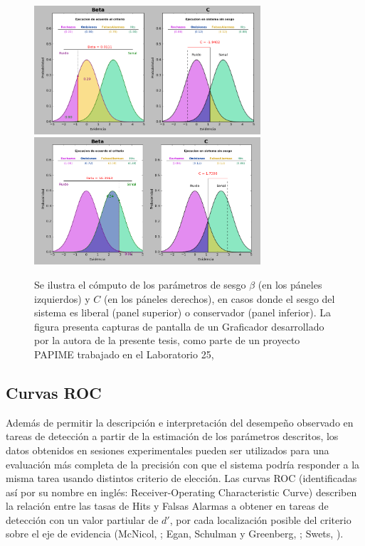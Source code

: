 \begin{itemize}
\begin{figure}[th]
\centering
\includegraphics[width=0.75\textwidth]{Figures/Graficador_Sesgo_Liberal}\\
\includegraphics[width=0.75\textwidth]{Figures/Graficador_Sesgo_Conservador}\\
\caption[Estimación del sesgo con base en el criterio]{Se ilustra el cómputo de los parámetros de sesgo $\beta$ (en los páneles izquierdos) y $C$ (en los páneles derechos), en casos donde el sesgo del sistema es liberal (panel superior) o conservador (panel inferior). La figura presenta capturas de pantalla de un Graficador desarrollado por la autora de la presente tesis, como parte de un proyecto PAPIME trabajado en el Laboratorio 25, \citep{PAPIME}}
\label{fig:Graf_Sesgo}
\end{figure}
\end{itemize}   %


\subsection{Curvas ROC}

Además de permitir la descripción e interpretación del desempeño observado en tareas de detección a partir de la estimación de los parámetros descritos, los datos obtenidos en sesiones experimentales pueden ser utilizados para una evaluación más completa de la precisión con que el sistema podría responder a la misma tarea usando distintos criterio de elección. Las curvas ROC (identificadas así por su nombre en inglés: Receiver-Operating Characteristic Curve) describen la relación entre las tasas de Hits y Falsas Alarmas a obtener en tareas de detección con un valor partiular de $d'$, por cada localización posible del criterio sobre el eje de evidencia (McNicol, \citeyear{McNicol2}; Egan, Schulman y Greenberg, \citeyear{Egan1959}; Swets, \citeyear{Swets1973}).\\

